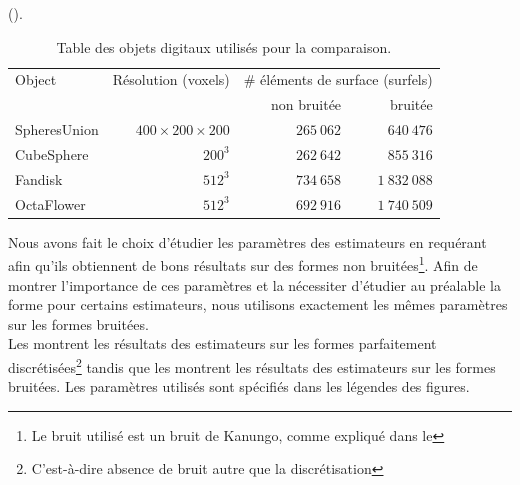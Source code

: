 ().
%
\begin{table}[h]
  \begin{center}
    \caption{Table des objets digitaux utilisés pour la comparaison.}
    \label{tab:feature-objects}
    \begin{tabular}{@{}lrrr@{}}
      \toprule
      Object & Résolution (voxels) & \multicolumn{2}{r}{\# éléments de surface (surfels)} \\ \cmidrule(l){3-4}
                     &            & non bruitée & bruitée \\ \midrule
      SpheresUnion    & $400 \times 200 \times 200$ & $265~062$ & $640~476$ \\
      CubeSphere     & $200^3$    & $262~642$ & $855~316$   \\
      Fandisk        & $512^3$    & $734~658$ & $1~832~088$   \\
      OctaFlower     & $512^3$    & $692~916$ & $1~740~509$   \\ \bottomrule
    \end{tabular}
  \end{center}
\end{table}
%
Nous avons fait le choix d'étudier les paramètres des estimateurs en requérant
afin qu'ils obtiennent de bons résultats sur des formes non bruitées\footnote{Le
bruit utilisé est un bruit de Kanungo, comme expliqué dans le
}. Afin de montrer l'importance de ces paramètres et
la nécessiter d'étudier au préalable la forme pour certains estimateurs, nous
utilisons exactement les mêmes paramètres sur les formes bruitées.
%
\\
%
Les  montrent les
résultats des estimateurs sur les formes parfaitement
discrétisées\footnote{C'est-à-dire absence de bruit autre que la discrétisation}
tandis que les
montrent les résultats des estimateurs sur les formes bruitées. Les paramètres
utilisés sont spécifiés dans les légendes des figures.
%
